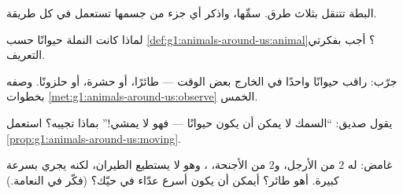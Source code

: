 \begin{exercise}[$\star$]\label{exo:g1:animals-around-us:6}
البطة تتنقل بثلاث طرق. سمِّها، واذكر أي جزء من جسمها تستعمل في كل
طريقة.
\end{exercise}

\begin{exercise}[$\star$]\label{exo:g1:animals-around-us:7}
لماذا كانت النملة حيوانًا حسب \cref{def:g1:animals-around-us:animal}؟
أجب بفكرتي التعريف.
\end{exercise}

\begin{exercise}[$\star$]\label{exo:g1:animals-around-us:8}
جرّب: راقب حيوانًا واحدًا في الخارج بعض الوقت --- طائرًا، أو حشرة،
أو حلزونًا. وصفه بخطوات \cref{met:g1:animals-around-us:observe}
الخمس.
\end{exercise}

\begin{exercise}[$\star\star$]\label{exo:g1:animals-around-us:9}
يقول صديق: ``السمك لا يمكن أن يكون حيوانًا --- فهو لا يمشي!''
بماذا تجيبه؟ استعمل \cref{prop:g1:animals-around-us:moving}.
\end{exercise}

\begin{exercise}[$\star\star$]\label{exo:g1:animals-around-us:10}
 غامض: له $2$ من الأرجل، و$2$ من الأجنحة، ، وهو لا يستطيع
الطيران، لكنه يجري بسرعة كبيرة. أهو طائر؟ أيمكن أن يكون أسرع عدّاء
في حيّك؟ (فكّر في النعامة.)
\end{exercise}
